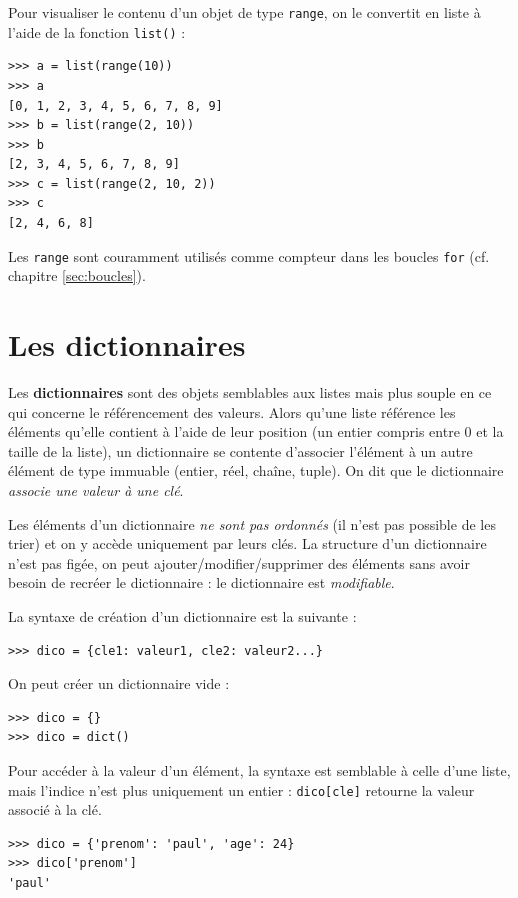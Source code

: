 \documentclass[12pt, a4paper]{article}
\begin{document}
Pour visualiser le contenu d'un objet de type \lstinline{range}, on le convertit en liste à l'aide de la fonction \lstinline{list()} :
\begin{lstlisting}
>>> a = list(range(10))
>>> a
[0, 1, 2, 3, 4, 5, 6, 7, 8, 9]
>>> b = list(range(2, 10))
>>> b
[2, 3, 4, 5, 6, 7, 8, 9]
>>> c = list(range(2, 10, 2))
>>> c
[2, 4, 6, 8]
\end{lstlisting}

Les \lstinline{range} sont couramment utilisés comme compteur dans les boucles \lstinline{for} (cf. chapitre \ref{sec:boucles}).



\section{Les dictionnaires}
Les \textbf{dictionnaires} sont des objets semblables aux listes mais plus souple en ce qui concerne le référencement des valeurs. Alors qu'une liste référence les éléments qu'elle contient à l'aide de leur position (un entier compris entre 0 et la taille de la liste), un dictionnaire se contente d'associer l'élément à un autre élément de type immuable (entier, réel, chaîne, tuple). On dit que le dictionnaire \textit{associe une valeur à une clé}.

Les éléments d'un dictionnaire \textit{ne sont pas ordonnés} (il n'est pas possible de les trier) et on y accède uniquement par leurs clés. La structure d'un dictionnaire n'est pas figée, on peut ajouter/modifier/supprimer des éléments sans avoir besoin de recréer le dictionnaire : le dictionnaire est \textit{modifiable}.

La syntaxe de création d'un dictionnaire est la suivante :
\begin{lstlisting}
>>> dico = {cle1: valeur1, cle2: valeur2...}
\end{lstlisting}

On peut créer un dictionnaire vide : 
\begin{lstlisting}
>>> dico = {}
>>> dico = dict()
\end{lstlisting}

Pour accéder à la valeur d'un élément, la syntaxe est semblable à celle d'une liste, mais l'indice n'est plus uniquement un entier : \lstinline{dico[cle]} retourne la valeur associé à la clé.
\begin{lstlisting}
>>> dico = {'prenom': 'paul', 'age': 24}
>>> dico['prenom']
'paul'
\end{lstlisting}
\end{document}

